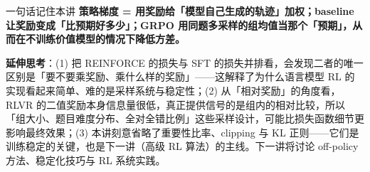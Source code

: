 \documentclass[a4paper]{article}
\begin{document}
\begin{importantbox}{一句话记住本讲}
\textbf{策略梯度 = 用奖励给「模型自己生成的轨迹」加权；baseline 让奖励变成「比预期好多少」；GRPO 用同题多采样的组均值当那个「预期」，从而在不训练价值模型的情况下降低方差。}
\end{importantbox}

\textbf{延伸思考}：(1) 把 REINFORCE 的损失与 SFT 的损失并排看，会发现二者的唯一区别是「要不要乘奖励、乘什么样的奖励」——这解释了为什么语言模型 RL 的实现看起来简单、难的是采样系统与稳定性；(2) 从「相对奖励」的角度看，RLVR 的二值奖励本身信息量很低，真正提供信号的是组内的相对比较，所以「组大小、题目难度分布、全对全错比例」这些采样设计，可能比损失函数细节更影响最终效果；(3) 本讲刻意省略了重要性比率、clipping 与 KL 正则——它们是训练稳定的关键，也是下一讲（高级 RL 算法）的主线。下一讲将讨论 off-policy 方法、稳定化技巧与 RL 系统实践。
\end{document}
